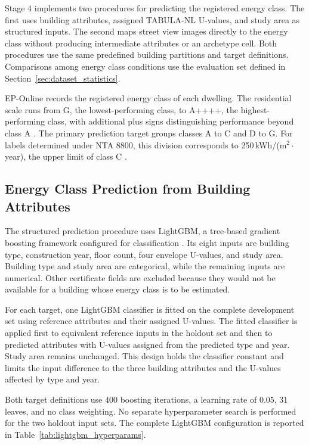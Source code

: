 Stage 4 implements two procedures for predicting the registered energy class.
The first uses building attributes, assigned TABULA-NL U-values, and study area as structured inputs.
The second maps street view images directly to the energy class without producing intermediate attributes or an archetype cell.
Both procedures use the same predefined building partitions and target definitions.
Comparisons among energy class conditions use the evaluation set defined in Section~\ref{sec:dataset_statistics}.

EP-Online records the registered energy class of each dwelling.
The residential scale runs from G, the lowest-performing class, to A++++, the highest-performing class, with additional plus signs distinguishing performance beyond class A \parencite{rvoenergielabel}.
The primary prediction target groups classes A to C and D to G.
For labels determined under NTA 8800, this division corresponds to 250\,kWh/(m$^2\cdot$year), the upper limit of class C \parencite{rvoenergielabel2024}.

\subsection{Energy Class Prediction from Building Attributes}
\label{sec:attribute_based_energy_class_prediction}

The structured prediction procedure uses \acf{LightGBM}, a tree-based gradient boosting framework configured for classification \parencite{ke2017}.
Its eight inputs are building type, construction year, floor count, four envelope U-values, and study area.
Building type and study area are categorical, while the remaining inputs are numerical.
Other certificate fields are excluded because they would not be available for a building whose energy class is to be estimated.

For each target, one \acs{LightGBM} classifier is fitted on the complete development set using reference attributes and their assigned U-values.
The fitted classifier is applied first to equivalent reference inputs in the holdout set and then to predicted attributes with U-values assigned from the predicted type and year.
Study area remains unchanged.
This design holds the classifier constant and limits the input difference to the three building attributes and the U-values affected by type and year.

Both target definitions use 400 boosting iterations, a learning rate of 0.05, 31 leaves, and no class weighting.
No separate hyperparameter search is performed for the two holdout input sets.
The complete \acs{LightGBM} configuration is reported in Table~\ref{tab:lightgbm_hyperparams}.


